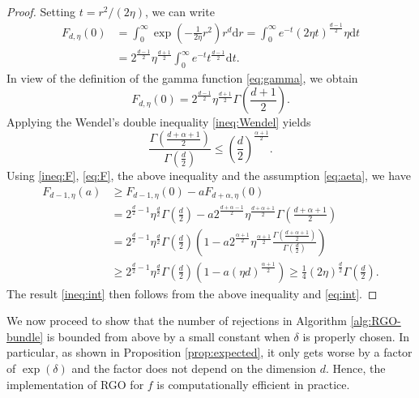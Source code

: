\documentclass[11pt,letterpaper]{article}
\newcommand{\nn}{\nonumber}
\newcommand{\rd}{\mathrm{d}}
\begin{document}
\begin{proof}
Setting $t=r^2/(2\eta)$, we can write
\begin{align}
    F_{d,\eta}(0) &=\int_0^\infty \exp\left( -\frac{1}{2\eta}r^2 \right) r^{d} \rd r
    =\int_0^\infty e^{-t} (2\eta t)^{\frac{d-1}2} \eta \rd t \nn \\
    &= 2^{\frac{d-1}2} \eta^{\frac{d+1}2} \int_0^\infty e^{-t}  t^{\frac{d-1}2} \rd t.
\end{align}
In view of the definition of the gamma function \eqref{eq:gamma}, we obtain
    \begin{equation}\label{eq:F}
        F_{d,\eta}(0) =2^{\frac{d-1}2} \eta^{\frac{d+1}2} \Gamma\left(\frac{d+1}{2}\right).
    \end{equation}
Applying the Wendel's double inequality \eqref{ineq:Wendel}
yields
\[
\frac{\Gamma\left(\frac{d+\alpha+1}{2} \right)}{\Gamma\left(\frac{d}{2} \right)} \le \left(\frac d2\right)^{\frac{\alpha+1}2}.
\]
Using \eqref{ineq:F}, \eqref{eq:F}, the above inequality and the assumption \eqref{eq:aeta}, we have
\begin{align*}
    F_{d-1,\eta}(a) &\ge F_{d-1,\eta}(0) - a F_{d+\alpha,\eta}(0) \\
    &= 2^{\frac d2-1} \eta^{\frac d2} \Gamma\left(\frac{d}{2}\right) - a 2^{\frac{d+\alpha-1}2} \eta^{\frac{d+\alpha+1}2} \Gamma\left(\frac{d+\alpha+1}{2}\right) \\
    &= 2^{\frac d2-1} \eta^{\frac d2} \Gamma\left(\frac{d}{2}\right) \left(1 - a 2^{\frac{\alpha+1}2} \eta^{\frac{\alpha+1}2} \frac{\Gamma\left(\frac{d+\alpha+1}{2} \right)}{\Gamma\left(\frac{d}{2} \right)} \right)\\
     &\ge 2^{\frac d2-1} \eta^{\frac d2} \Gamma\left(\frac{d}{2}\right) \left(1 - a (\eta d)^{\frac{\alpha+1}2} \right) \ge \frac14 (2\eta)^{\frac d2} \Gamma\left(\frac{d}{2}\right).
\end{align*}
The result \eqref{ineq:int} then follows from the above inequality and \eqref{eq:int}.
\end{proof}

We now proceed to show that the number of rejections in Algorithm \ref{alg:RGO-bundle} is bounded from above by a small constant when $\delta$ is properly chosen. In particular, as shown in Proposition \ref{prop:expected}, it only gets worse by a factor of $\exp(\delta)$ and the factor does not depend on the dimension $d$.
Hence, the implementation of RGO for $f$ is computationally efficient in practice.
\end{document}
